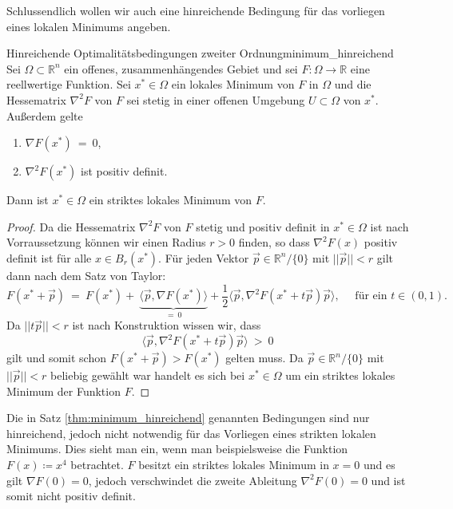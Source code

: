 Schlussendlich wollen wir auch eine hinreichende Bedingung für das vorliegen eines lokalen Minimums angeben.
\begin{theorem}{Hinreichende Optimalitätsbedingungen zweiter Ordnung}{minimum_hinreichend}
Sei $\Omega \subset \mathbb{R}^n$ ein offenes, zusammenhängendes Gebiet und sei $F \colon \Omega \rightarrow \mathbb{R}$ eine reellwertige Funktion. 
Sei $x^*\in \Omega$ ein lokales Minimum von $F$ in $\Omega$ und die Hessematrix $\nabla^2 F$ von $F$ sei stetig in einer offenen Umgebung $U \subset \Omega$ von $x^*$. 
Außerdem gelte
\begin{enumerate}[label=(\roman*)]
\item $\nabla F(x^*) \ = \ 0$,
\item $\nabla^2 F(x^*)$ ist positiv definit.
\end{enumerate}
Dann ist $x^* \in \Omega$ ein striktes lokales Minimum von $F$.
\end{theorem}
\begin{proof}
Da die Hessematrix $\nabla^2 F$ von $F$ stetig und positiv definit in $x^* \in \Omega$ ist nach Vorraussetzung können wir einen Radius $r > 0$ finden, so dass $\nabla^2 F(x)$ positiv definit ist für alle $x \in B_r(x^*)$. 
Für jeden Vektor $\vec{p} \in \mathbb{R}^n / \lbrace 0\rbrace$ mit $||\vec{p}|| < r$ gilt dann nach dem Satz von Taylor:
\begin{equation*}
F(x^* + \vec{p}) \ = \ F(x^*) +~\underbrace{\langle \vec{p}, \nabla F(x^*) \rangle}_{=~0} + \frac{1}{2} \langle \vec{p}, \nabla^2F(x^* + t\vec{p})\vec{p} \rangle, \quad \text{ für ein } t\in (0,1).
\end{equation*}
Da $||t\vec{p}|| < r$ ist nach Konstruktion wissen wir, dass
\begin{equation*}
\langle \vec{p}, \nabla^2F(x^* + t\vec{p})\vec{p} \rangle \ > \ 0
\end{equation*}
gilt und somit schon $F(x^* + \vec{p}) > F(x^*)$ gelten muss. 
Da $\vec{p} \in \mathbb{R}^n / \lbrace 0 \rbrace$ mit $||\vec{p}|| < r$ beliebig gewählt war handelt es sich bei $x^* \in \Omega$ um ein striktes lokales Minimum der Funktion $F$.
\end{proof}
\begin{remark}{}{}
Die in Satz \ref{thm:minimum_hinreichend} genannten Bedingungen sind nur hinreichend, jedoch nicht notwendig für das Vorliegen eines strikten lokalen Minimums. 
Dies sieht man ein, wenn man beispielsweise die Funktion $F(x) \coloneqq x^4$ betrachtet. $F$ besitzt ein striktes lokales Minimum in $x=0$ und es gilt $\nabla F(0) = 0$, jedoch verschwindet die zweite Ableitung $\nabla^2F(0) = 0$ und ist somit nicht positiv definit.
\end{remark}
